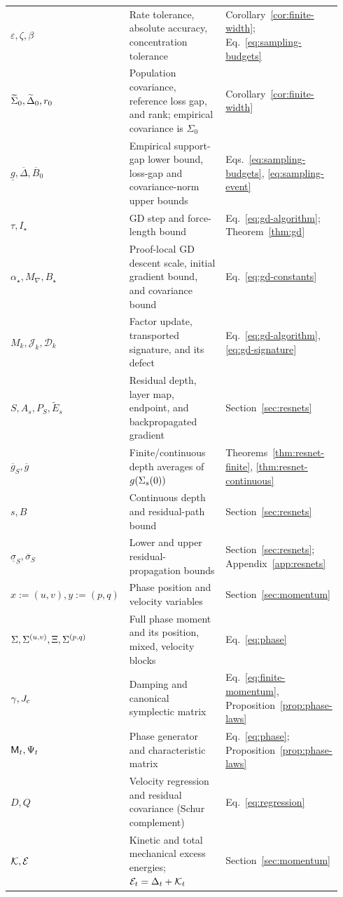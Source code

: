 \begin{longtable}{@{}>{\raggedright\arraybackslash}p{0.21\linewidth}
 >{\raggedright\arraybackslash}p{0.53\linewidth}
 >{\raggedright\arraybackslash}p{0.20\linewidth}@{}}
\(\varepsilon,\zeta,\beta\)&Rate tolerance, absolute accuracy, concentration tolerance&Corollary~\ref{cor:finite-width}; Eq.~\eqref{eq:sampling-budgets}\\
\(\widetilde\Sigma_0,\widetilde\Delta_0,r_0\)&Population covariance, reference loss gap, and rank; empirical covariance is $\Sigma_0$&Corollary~\ref{cor:finite-width}\\
\(\underline g,\overline\Delta,\overline B_0\)&Empirical support-gap lower bound, loss-gap and covariance-norm upper bounds&Eqs.~\eqref{eq:sampling-budgets}, \eqref{eq:sampling-event}\\
\(\tau,I_\star\)&GD step and force-length bound&Eq.~\eqref{eq:gd-algorithm}; Theorem~\ref{thm:gd}\\
\(\alpha_\star,M_{\nabla},B_\star\)&Proof-local GD descent scale, initial gradient bound, and covariance bound&Eq.~\eqref{eq:gd-constants}\\
\(M_k,\mathcal J_k,\mathcal D_k\)&Factor update, transported signature, and its defect&Eq.~\eqref{eq:gd-algorithm}, \eqref{eq:gd-signature}\\
\(S,A_s,P_S,\widetilde E_s\)&Residual depth, layer map, endpoint, and backpropagated gradient&Section~\ref{sec:resnets}\\
\(\overline g_S,\overline g\)&Finite/continuous depth averages of $g(\Sigma_s(0))$&Theorems~\ref{thm:resnet-finite}, \ref{thm:resnet-continuous}\\
\(s,B\)&Continuous depth and residual-path bound&Section~\ref{sec:resnets}\\
\(\underline{\sigma}_S,\overline{\sigma}_S\)&Lower and upper residual-propagation bounds&Section~\ref{sec:resnets}; Appendix~\ref{app:resnets}\\
\(x:=(u,v),y:=(p,q)\)&Phase position and velocity variables&Section~\ref{sec:momentum}\\
\(\Sigma,\Sigma^{(u,v)},\Xi,\Sigma^{(p,q)}\)&Full phase moment and its position, mixed, velocity blocks&Eq.~\eqref{eq:phase}\\
\(\gamma,J_{\mathrm c}\)&Damping and canonical symplectic matrix&Eq.~\eqref{eq:finite-momentum}, Proposition~\ref{prop:phase-laws}\\
\(\mathsf M_t,\Psi_t\)&Phase generator and characteristic matrix&Eq.~\eqref{eq:phase}; Proposition~\ref{prop:phase-laws}\\
\(D,Q\)&Velocity regression and residual covariance (Schur complement)&Eq.~\eqref{eq:regression}\\
\(\mathcal{K},\mathcal E\)&Kinetic and total mechanical excess energies; $\mathcal E_t=\Delta_t+\mathcal{K}_t$&Section~\ref{sec:momentum}\\

\end{longtable}
